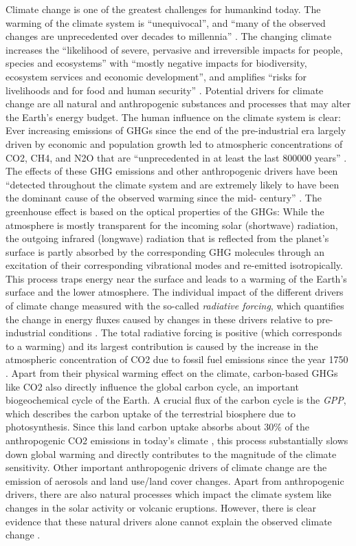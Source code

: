 Climate change is one of the greatest challenges for humankind today. The
warming of the climate system is \enquote{unequivocal}, and \enquote{many of
  the observed changes are unprecedented over decades to millennia}
\autocite{IPCC2014}. The changing climate increases the \enquote{likelihood of
  severe, pervasive and irreversible impacts for people, species and
  ecosystems} with \enquote{mostly negative impacts for biodiversity, ecosystem
services and economic development}, and amplifies \enquote{risks for
livelihoods and for food and human security} \autocite{IPCC2014}. Potential
drivers for climate change are all natural and anthropogenic substances and
processes that may alter the Earth's energy budget. The human influence on
the climate system is clear: Ever increasing emissions of \acp{GHG} since the
end of the pre-industrial era largely driven by economic and population
growth led to atmospheric concentrations of \ac{CO2}, \ac{CH4}, and \ac{N2O}
that are \enquote{unprecedented in at least the last 800000 years}
\autocite{IPCC2014}. The effects of these \ac{GHG} emissions and other
anthropogenic drivers have been \enquote{detected throughout the climate
system and are extremely likely to have been the dominant cause of the
observed warming since the mid- century} \autocite{IPCC2014}. The
greenhouse effect is based on the optical properties of the \acp{GHG}: While
the atmosphere is mostly transparent for the incoming solar (shortwave)
radiation, the outgoing infrared (longwave) radiation that is reflected from
the planet's surface is partly absorbed by the corresponding \ac{GHG}
molecules through an excitation of their corresponding vibrational modes and
re-emitted isotropically. This process traps energy near the surface and
leads to a warming of the Earth's surface and the lower atmosphere. The
individual impact of the different drivers of climate change measured with
the so-called \emph{radiative forcing}, which quantifies the change in energy
fluxes caused by changes in these drivers relative to pre-industrial
conditions \autocite{IPCC2013}. The total radiative forcing is positive
(which corresponds to a warming) and its largest contribution is caused by
the increase in the atmospheric concentration of \ac{CO2} due to fossil fuel
emissions since the year 1750 \autocite{IPCC2014}. Apart from their physical
warming effect on the climate, carbon-based \acp{GHG} like \ac{CO2} also
directly influence the global carbon cycle, an important biogeochemical cycle
of the Earth. A crucial flux of the carbon cycle is the \emph{\ac{GPP}}, which
describes the carbon uptake of the terrestrial biosphere due to
photosynthesis. Since this land carbon uptake absorbs about $30 \unit{\%}$ of
the anthropogenic \ac{CO2} emissions in today's climate
\autocite{Friedlingstein2020}, this process substantially slows down global
warming and directly contributes to the magnitude of the climate sensitivity.
Other important anthropogenic drivers of climate change are the emission of
aerosols and land use/land cover changes. Apart from anthropogenic drivers,
there are also natural processes which impact the climate system like changes
in the solar activity or volcanic eruptions. However, there is clear evidence
that these natural drivers alone cannot explain the observed climate change
\autocite{Haustein2017}.

